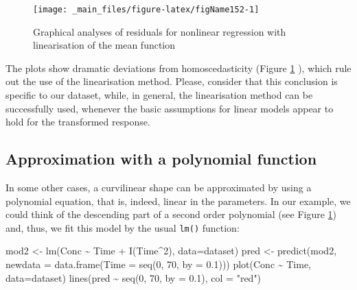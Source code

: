 \documentclass[a4paper,12pt,oneside]{book}
\newenvironment{Shaded}{\begin{snugshade}}{\end{snugshade}}
\newcommand{\DecValTok}[1]{#1}
\newcommand{\FloatTok}[1]{#1}
\newcommand{\SpecialCharTok}[1]{#1}
\newcommand{\StringTok}[1]{#1}
\newcommand{\OtherTok}[1]{#1}
\newcommand{\FunctionTok}[1]{#1}
\newcommand{\AttributeTok}[1]{#1}
\newcommand{\NormalTok}[1]{#1}
\begin{document}
\begin{figure}

{\centering \texttt{[image: \_main\_files/figure-latex/figName152-1]} 

}

\caption{Graphical analyses of residuals for nonlinear regression with linearisation of the mean function}\label{fig:figName152}
\end{figure}

The plots show dramatic deviations from homoscedasticity (Figure \ref{fig:figName152} ), which rule out the use of the linearisation method. Please, consider that this conclusion is specific to our dataset, while, in general, the linearisation method can be successfully used, whenever the basic assumptions for linear models appear to hold for the transformed response.

\hypertarget{approximation-with-a-polynomial-function}{%
\subsection{Approximation with a polynomial function}\label{approximation-with-a-polynomial-function}}

In some other cases, a curvilinear shape can be approximated by using a polynomial equation, that is, indeed, linear in the parameters. In our example, we could think of the descending part of a second order polynomial (see Figure \ref{fig:figName152}) and, thus, we fit this model by the usual \texttt{lm()} function:

\begin{Shaded}
\begin{Highlighting}[]
\NormalTok{mod2 }\OtherTok{\textless{}{-}} \FunctionTok{lm}\NormalTok{(Conc }\SpecialCharTok{\textasciitilde{}}\NormalTok{ Time }\SpecialCharTok{+} \FunctionTok{I}\NormalTok{(Time}\SpecialCharTok{\^{}}\DecValTok{2}\NormalTok{), }\AttributeTok{data=}\NormalTok{dataset)}
\NormalTok{pred }\OtherTok{\textless{}{-}} \FunctionTok{predict}\NormalTok{(mod2, }\AttributeTok{newdata =} \FunctionTok{data.frame}\NormalTok{(}\AttributeTok{Time =} \FunctionTok{seq}\NormalTok{(}\DecValTok{0}\NormalTok{, }\DecValTok{70}\NormalTok{, }\AttributeTok{by =} \FloatTok{0.1}\NormalTok{)))}
\FunctionTok{plot}\NormalTok{(Conc }\SpecialCharTok{\textasciitilde{}}\NormalTok{ Time, }\AttributeTok{data=}\NormalTok{dataset)}
\FunctionTok{lines}\NormalTok{(pred }\SpecialCharTok{\textasciitilde{}} \FunctionTok{seq}\NormalTok{(}\DecValTok{0}\NormalTok{, }\DecValTok{70}\NormalTok{, }\AttributeTok{by =} \FloatTok{0.1}\NormalTok{), }\AttributeTok{col =} \StringTok{"red"}\NormalTok{)}
\end{Highlighting}
\end{Shaded}
\end{document}
